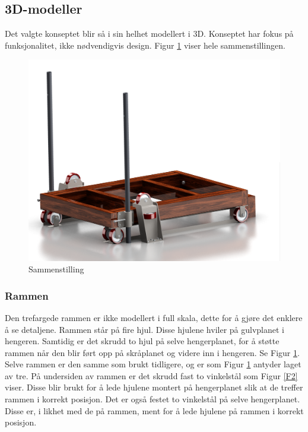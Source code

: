 \subsection{3D-modeller}
Det valgte konseptet blir så i sin helhet modellert i 3D. Konseptet har fokus på funksjonalitet, ikke nødvendigvis design. Figur \ref{F1} viser hele sammenstillingen. 

\begin{figure}[H]
\centerline{\includegraphics [width=15cm]{images/1.png}}
\caption{Sammenstilling}
\label{F1}
\end{figure}

\subsubsection{Rammen}
Den trefargede rammen er ikke modellert i full skala, dette for å gjøre det enklere å se detaljene. 
Rammen står på fire hjul. Disse hjulene hviler på gulvplanet i hengeren. Samtidig er det skrudd to hjul på selve hengerplanet, for å støtte rammen når den blir ført opp på skråplanet og videre inn i hengeren. Se Figur \ref{F1}. Selve rammen er den samme som brukt tidligere, og er som Figur \ref{F1} antyder laget av tre. På undersiden av rammen er det skrudd fast to vinkelstål som Figur \ref{F2} viser. Disse blir brukt for å lede hjulene montert på hengerplanet slik at de treffer rammen i korrekt posisjon. 
Det er også festet to vinkelstål på selve hengerplanet. Disse er, i likhet med de på rammen, ment for å lede hjulene på rammen i korrekt posisjon.
 
